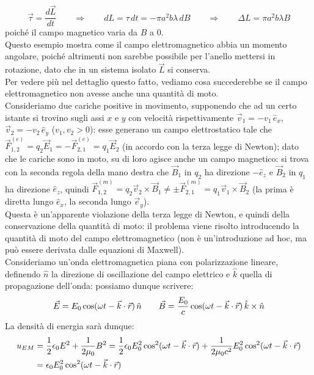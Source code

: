 \begin{equation}
	\vec{\tau} = \frac{d\vec{L}}{dt} \qquad\Longrightarrow\qquad dL = \tau \,dt = -\pi a^2 b \lambda \,dB \qquad\Longrightarrow\qquad \Delta L = \pi a^2 b \lambda B
	\label{eq:38}
\end{equation}
poiché il campo magnetico varia da $ B $ a $ 0 $. \\ 
%
Questo esempio mostra come il campo elettromagnetico abbia un momento angolare, poiché altrimenti non sarebbe possibile per l'anello mettersi in rotazione, dato che in un sistema isolato $ \vec{L} $ si conserva. \\ 
Per vedere più nel dettaglio questo fatto, vediamo cosa succederebbe se il campo elettromagnetico non avesse anche una quantità di moto. \\ 
Consideriamo due cariche positive in movimento, supponendo che ad un certo istante si trovino sugli assi $ x $ e $ y $ con velocità rispettivamente $ \vec{v}_1 = - v_1 \,\hat{e}_x $, $ \vec{v}_2 = - v_2 \,\hat{e}_y $ ($ v_1, v_2 > 0 $): esse generano un campo elettrostatico tale che $ \vec{F}^{(e)}_{1,2} = q_2 \vec{E}_1 = - \vec{F}^{(e)}_{2,1} = q_1 \vec{E}_2 $ (in accordo con la terza legge di Newton); dato che le cariche sono in moto, su di loro agisce anche un campo magnetico: si trova con la seconda regola della mano destra che $ \vec{B}_1 $ in $ q_2 $ ha direzione $ -\hat{e}_z $ e $ \vec{B}_2 $ in $ q_1 $ ha direzione $ \hat{e}_z $, quindi $ \vec{F}^{(m)}_{1,2} = q_2 \vec{v}_2 \times \vec{B}_1 \neq \pm \vec{F}^{(m)}_{2,1} = q_1 \vec{v}_1 \times \vec{B}_2 $ (la prima è diretta lungo $ \hat{e}_x $, la seconda lungo $ \vec{e}_y $). \\ 
%
Questa è un'apparente violazione della terza legge di Newton, e quindi della conservazione della quantità di moto: il problema viene risolto introducendo la quantità di moto del campo elettromagnetico (non è un'introduzione ad hoc, ma può essere derivata dalle equazioni di Maxwell). \\ 
Consideriamo un'onda elettromagnetica piana con polarizzazione lineare, definendo $ \hat{n} $ la direzione di oscillazione del campo elettrico e $ \hat{k} $ quella di propagazione dell'onda: possiamo dunque scrivere:
\begin{equation}
	\vec{E} = E_0 \cos(\omega t - \vec{k}\cdot\vec{r}) \,\hat{n} \qquad \vec{B} = \frac{E_0}{c} \cos(\omega t - \vec{k}\cdot\vec{r}) \,\hat{k}\times\hat{n}
	\label{eq:39}
\end{equation}
La densità di energia sarà dunque:
\begin{equation}
	\begin{split}
		u_{EM} &= \frac{1}{2} \epsilon_0 E^2 + \frac{1}{2\mu_0} B^2 = \frac{1}{2} \epsilon_0 E_0^2 \cos^2 (\omega t - \vec{k}\cdot\vec{r}) + \frac{1}{2\mu_0 c^2} E_0^2 \cos^2 (\omega t - \vec{k}\cdot\vec{r}) \\ 
		       &= \epsilon_0 E_0^2 \cos^2 (\omega t - \vec{k}\cdot\vec{r})
	\end{split}
	\label{eq:40}
\end{equation}
